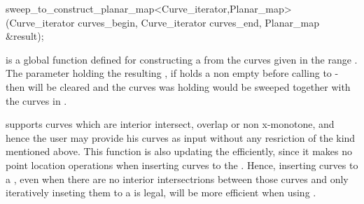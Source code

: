 
\ccRefPageBegin


\begin{ccRefFunction}{sweep_to_construct_planar_map<Curve_iterator,Planar_map>(Curve_iterator curves_begin, Curve_iterator curves_end, Planar_map &result);}


\ccDefinition
{} is a global function defined for constructing a  from the curves given in the range 
\ccStyle{[curves_begin, curves_end)}. The parameter  holding the resulting , if  holds a non empty  before calling to  - then  will be cleared and the curves  was holding would be sweeped together with the curves in \ccStyle{[curves_begin, curves_end)}.

 supports curves which are interior intersect, overlap or non x-monotone, and hence the user may provide his curves as input without any resriction of the kind mentioned above. 
This function is also updating the  efficiently, since it makes no point location operations when inserting curves to the . Hence, inserting curves to a , even when there are no interior intersectrions between those curves and only iteratively inseting them to a  is legal, will be more efficient when using .



\end{ccRefFunction} %

\ccRefPageEnd











